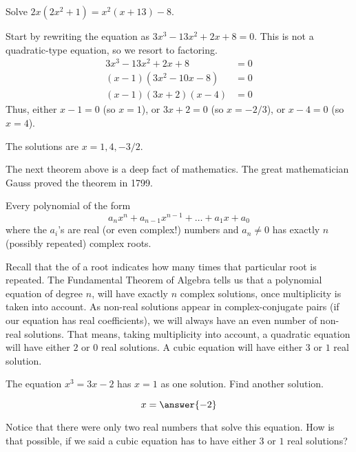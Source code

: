 \documentclass{ximera}
\begin{document}
\begin{example}
	Solve  $2x(2x^2 + 1) = x^2(x +13) - 8$.
	\begin{explanation}
		Start by rewriting the equation as $3x^3-13x^2+2x+8 = 0$.  This is not a quadratic-type equation, so we resort to factoring.
		\begin{align*}
			3x^3-13x^2+2x+8 &= 0\\
			(x-1)(3x^2-10x-8) &= 0\\
			(x-1)(3x+2)(x-4) &= 0
		\end{align*}
		Thus, either $x -1 = 0$ (so $x = 1$), or $3x+2=0$ (so $x = -2/3$), or $x-4 = 0$ (so $x=4$).
		
		The solutions are $x = 1, 4, -3/2$.
	\end{explanation}
\end{example}


The next theorem above is a deep fact of mathematics. The great mathematician Gauss proved the theorem in 1799. 
\begin{theorem}
  Every polynomial of the form
  \[
  a_n x^n + a_{n-1} x^{n-1} + \dots + a_1 x + a_0
  \]
  where the $a_i$'s are real (or even complex!) numbers and $a_n \ne 0$ has exactly
  $n$ (possibly repeated) complex roots.
\end{theorem}

Recall that the  of a root indicates how many times that particular root is repeated.
The Fundamental Theorem of Algebra tells us that a polynomial equation of degree $n$, will have exactly $n$ complex solutions, once multiplicity
is taken into account.  As non-real solutions appear in complex-conjugate pairs  (if our equation has real coefficients), we will always have an even number of non-real
solutions.  That means, taking multiplicity into account, a quadratic equation will have either $2$ or $0$ real solutions.  A cubic equation will have either $3$ or $1$ real
solution.


\begin{problem}

	The equation $x^3 = 3x-2$ has $x=1$ as one solution.  Find another solution.
	
	\begin{prompt}
		\[ x= \answer{-2} \]
	\end{prompt}
	\begin{feedback}
  		Notice that there were only two real numbers that solve this equation.  How is that possible, if we said a cubic equation has to have either
		$3$ or $1$ real solutions?
  	\end{feedback}
\end{problem}
\end{document}

